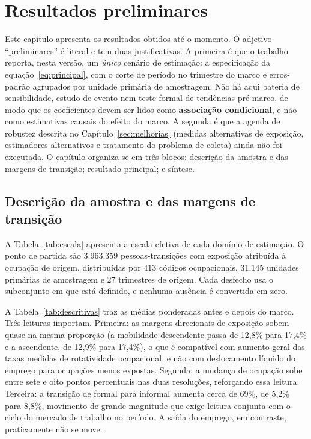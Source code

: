 \section{Resultados preliminares}
\label{sec:resultados}

Este capítulo apresenta os resultados obtidos até o momento. O adjetivo
``preliminares'' é literal e tem duas justificativas. A primeira é que o trabalho
reporta, nesta versão, um \emph{único} cenário de estimação: a especificação da
equação~\eqref{eq:principal}, com o corte de período no trimestre do marco e
erros-padrão agrupados por unidade primária de amostragem. Não há aqui bateria
de sensibilidade, estudo de evento nem teste formal de tendências pré-marco, de
modo que os coeficientes devem ser lidos como \textbf{associação condicional}, e
não como estimativas causais do efeito do marco. A segunda é que a agenda de
robustez descrita no Capítulo~\ref{sec:melhorias} (medidas alternativas de
exposição, estimadores alternativos e tratamento do problema de coleta) ainda
não foi executada. O capítulo organiza-se em três blocos: descrição da amostra e
das margens de transição; resultado principal; e síntese.

\subsection{Descrição da amostra e das margens de transição}

A Tabela~\ref{tab:escala} apresenta a escala efetiva de cada domínio de
estimação. O ponto de partida são 3.963.359 pessoas-transições com exposição
atribuída à ocupação de origem, distribuídas por 413 códigos ocupacionais,
31.145 unidades primárias de amostragem e 27 trimestres de origem. Cada desfecho
usa o subconjunto em que está definido, e nenhuma ausência é convertida em zero.



A Tabela~\ref{tab:descritivas} traz as médias ponderadas antes e depois do
marco. Três leituras importam. Primeira: as margens direcionais de exposição
sobem quase na mesma proporção (a mobilidade descendente passa de 12,8\% para
17,4\% e a ascendente, de 12,9\% para 17,4\%), o que é compatível com aumento geral das taxas medidas de rotatividade
ocupacional, e não com deslocamento líquido do emprego para ocupações menos
expostas. Segunda: a mudança de ocupação sobe entre sete e oito pontos
percentuais nas duas resoluções, reforçando essa leitura. Terceira: a transição
de formal para informal aumenta cerca de 69\%, de 5,2\% para 8,8\%, movimento
de grande magnitude que exige leitura conjunta
com o ciclo do mercado de trabalho no período. A saída do emprego, em contraste,
praticamente não se move.

